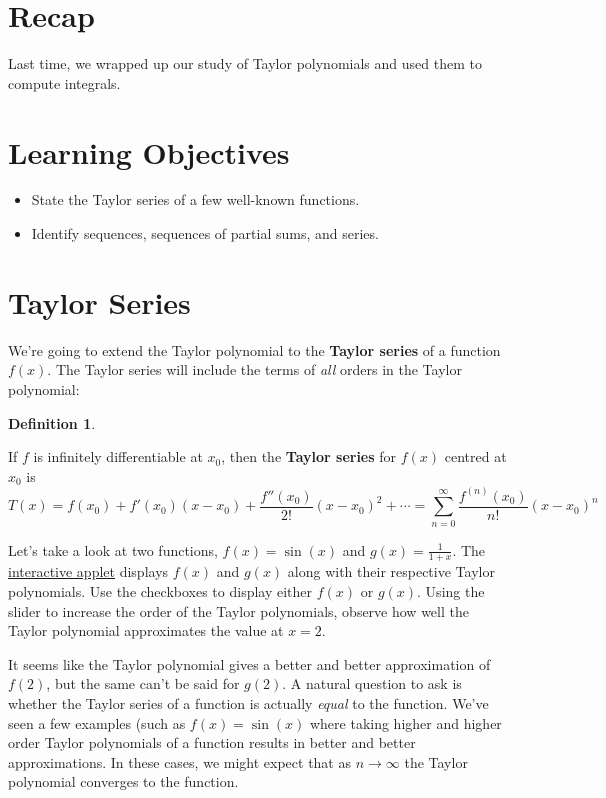 \documentclass[
]{book}
\providecommand{\tightlist}{%
  \setlength{\itemsep}{0pt}\setlength{\parskip}{0pt}}
\theoremstyle{definition}
\newtheorem{definition}{Definition}[chapter]
\theoremstyle{definition}
\theoremstyle{definition}
\theoremstyle{definition}
\theoremstyle{remark}
\begin{document}
\hypertarget{recap-23}{%
\section{Recap}\label{recap-23}}

Last time, we wrapped up our study of Taylor polynomials and used them to compute integrals.

\hypertarget{learning-objectives-24}{%
\section{Learning Objectives}\label{learning-objectives-24}}

\begin{itemize}
\tightlist
\item
  State the Taylor series of a few well-known functions.
\item
  Identify sequences, sequences of partial sums, and series.
\end{itemize}

\hypertarget{taylor-series}{%
\section{Taylor Series}\label{taylor-series}}

We're going to extend the Taylor polynomial to the \textbf{Taylor series} of a function \(f(x)\). The Taylor series will include the terms of \emph{all} orders in the Taylor polynomial:

\begin{definition}
\protect\hypertarget{def:unlabeled-div-170}{}\label{def:unlabeled-div-170}

If \(f\) is infinitely differentiable at \(x_0\), then the \textbf{Taylor series} for \(f(x)\) centred at \(x_0\) is \[T(x)=f(x_0)+f'(x_0)(x-x_0)+\frac{f''(x_0)}{2!}(x-x_0)^2+\cdots  = \sum_{n=0}^{\infty}\frac{f^{(n)}(x_0)}{n!}(x-x_0)^n\]

\end{definition}

Let's take a look at two functions, \(f(x)=\sin(x)\) and \(g(x)=\frac{1}{1+x}\). The \href{https://www.geogebra.org/m/z2awkcej}{interactive applet} displays \(f(x)\) and \(g(x)\) along with their respective Taylor polynomials. Use the checkboxes to display either \(f(x)\) or \(g(x)\). Using the slider to increase the order of the Taylor polynomials, observe how well the Taylor polynomial approximates the value at \(x=2\).

It seems like the Taylor polynomial gives a better and better approximation of \(f(2)\), but the same can't be said for \(g(2)\). A natural question to ask is whether the Taylor series of a function is actually \emph{equal} to the function. We've seen a few examples (such as \(f(x)=\sin(x)\) where taking higher and higher order Taylor polynomials of a function results in better and better approximations. In these cases, we might expect that as \(n\to\infty\) the Taylor polynomial converges to the function.
\end{document}

